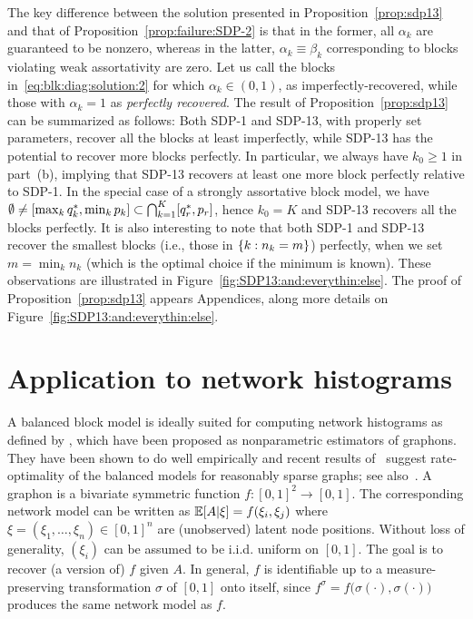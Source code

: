 The key difference between the solution presented in Proposition~\ref{prop:sdp13} and that of Proposition~\ref{prop:failure:SDP-2} is that in the former, all $\alpha_k$ are guaranteed to be nonzero, whereas in the latter, $\alpha_k \equiv \beta_k$ corresponding to blocks violating weak assortativity are zero. Let us call the blocks in~\eqref{eq:blk:diag:solution:2} for which $\alpha_k \in (0,1)$, as imperfectly-recovered, while those with $\alpha_k = 1$ as \emph{perfectly recovered}. The result of Proposition~\ref{prop:sdp13} can be summarized as follows: Both SDP-1 and SDP-13, with properly set parameters, recover all the blocks at least imperfectly, while SDP-13 has the potential to recover more blocks perfectly. In particular, we always have $k_0 \ge 1$ in part~(b), implying that SDP-13 recovers at least one more block perfectly relative to SDP-1. In the special case of a strongly assortative block model, we have $\emptyset \neq [\max_k q^*_k, \min_k p_k] \subset \bigcap_{k=1}^K [q^*_r,p_r]$, hence $k_0 = K$ and SDP-13 recovers all the blocks perfectly. It is also interesting to note that both SDP-1 and SDP-13 recover the smallest blocks (i.e., those in $\{k :n_k = m\}$) perfectly, when we set $m = \min_k n_k$ (which is the optimal choice if the minimum is known). These observations are illustrated in Figure~\ref{fig:SDP13:and:everythin:else}. The proof of Proposition~\ref{prop:sdp13} appears Appendices, along more details on Figure~\ref{fig:SDP13:and:everythin:else}.










% 
\section{Application to network histograms}\label{sec:graphon}
A balanced block model is ideally suited for computing network histograms as defined by \cite{Olhede2013}, which have been proposed as nonparametric estimators of graphons.  They have been shown to do well empirically and recent results of~\cite[Section~2.4]{Klopp2015} suggest rate-optimality of the balanced models for reasonably sparse graphs;  see also~\cite{Gao2015}.
%
A graphon is a bivariate symmetric function $f : [0,1]^2 \to [0,1]$. The corresponding network model can be written as $\mathbb{E}[A | \xi] = f(\xi_i,\xi_j)$ where $\xi = (\xi_1,\dots,\xi_n) \in [0,1]^n$ are (unobserved) latent node positions. Without loss of generality, $(\xi_i)$ can be assumed to be i.i.d. uniform on $[0,1]$. The goal is to recover (a version of) $f$ given $A$. In general, $f$ is identifiable up to a measure-preserving transformation $\sigma$ of $[0,1]$ onto itself, since $f^{\sigma} = f\big(\sigma(\cdot),\sigma(\cdot)\big)$ produces the same network model as $f$.

